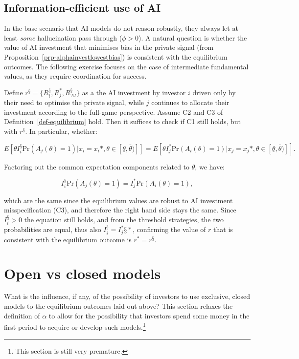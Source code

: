 \documentclass[
]{article}
\theoremstyle{plain}
\theoremstyle{definition}
\theoremstyle{remark}
\begin{document}
\subsection{Information-efficient use of
AI}\label{information-efficient-use-of-ai}

In the base scenario that AI models do not reason robustly, they always
let at least \emph{some} hallucination pass through (\(\phi > 0\)). A
natural question is whether the value of AI investment that minimises
bias in the private signal (from
Proposition~\ref{prp-alphainvestlowestbias}) is consistent with the
equilibrium outcomes. The following exercise focuses on the case of
intermediate fundamental values, as they require coordination for
success.

Define \(r^§ = \{R_i^§, R_j^*, R_{AI}^§\}\) as a the AI investment by
investor \(i\) driven only by their need to optimise the private signal,
while \(j\) continues to allocate their investment according to the
full-game perspective. Assume C2 and C3 of
Definition~\ref{def-equilibrium} hold. Then it suffices to check if C1
still holds, but with \(r^§\). In particular, whether:

\[
E[\theta I_i^§ \text{Pr}(A_j(\theta)=1) | x_i = x_i*, \theta \in [\underline{\theta}, \bar{\theta})]] = E[\theta I_j^* \text{Pr}(A_i(\theta)=1) | x_j = x_j*, \theta \in [\underline{\theta}, \bar{\theta})]].
\]

Factoring out the common expectation components related to \(\theta\),
we have:

\[
I_i^§ \text{Pr}(A_j(\theta)=1) = I_j^* \text{Pr}(A_i(\theta)=1),
\]

which are the same since the equilibrium values are robust to AI
investment misspecification (C3), and therefore the right hand side
stays the same. Since \(I_i^§ > 0\) the equation still holds, and from
the threshold strategies, the two probabilities are equal, thus also
\(I_i^§ = I_j^*§*\), confirming the value of \(r\) that is consistent
with the equilibrium outcome is \(r^* = r^§\).

\section{Open vs closed models}\label{sec-closedmodels}

What is the influence, if any, of the possibility of investors to use
exclusive, closed models to the equilibrium outcomes laid out above?
This section relaxes the definition of \(\alpha\) to allow for the
possibility that investors spend some money in the first period to
acquire or develop such models.\footnote{This section is still very
  premature.}
\end{document}

